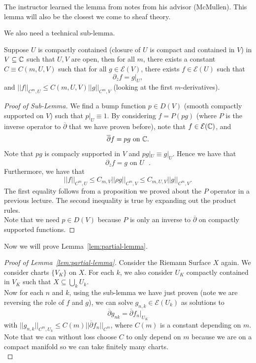 \documentclass{article}
\begin{document}
{\begin{remark}
    The instructor learned the lemma from notes from his advisor (McMullen). This lemma will also be the closest we come to sheaf theory.
\end{remark}

We also need a technical sub-lemma.
\begin{lemma}
    Suppose $U$ is compactly contained (closure of $U$ is compact and contained in $V$) in $V \subseteq \mathbb{C}$ such that $U, V$ are open, then for all $m$, there exists a constant $C \equiv C(m, U, V)$ such that for all $g \in \mathcal{E}(V)$, there exists $f \in \mathcal{E}(U)$ such that
    \[\partial_{\overline{z}} f = g|_U,\]
    and $||f||_{C^m, U} \leq C(m, U, V) ||g||_{C^m, V}$ (looking at the first $m$-derivatives).
\end{lemma}

\begin{proof}[Proof of Sub-Lemma]
    We find a bump function $p \in D(V)$ (smooth compactly supported on $V$) such that $p|_U \equiv 1$. By considering $f = P(pg)$ (where $P$ is the inverse operator to $\overline{\partial}$ that we have proven before), note that $f \in \mathcal{E}(\mathbb{C})$, and
    \[\overline{\partial} f = p g \text{ on } \mathbb{C}.\]
    Note that $pg$ is compacly supported in $V$ and $pg|_U \equiv g|_U$. Hence we have that
    \[\partial_{\overline{z}} f = g \text{ on $U$ }.\]
    Furthermore, we have that
    \[||f||_{C^m, U} \leq C_{m, V} || \rho g||_{C^m, V} \leq C_{m, U, V} ||g||_{C^m, V}. \]
    The first equality follows from a proposition we proved about the $P$ operator in a previous lecture. The second inequality is true by expanding out the product rules.\\
    
    Note that we need $p \in D(V)$ because $P$ is only an inverse to $\overline{\partial}$ on compactly supported functions.
\end{proof}

Now we will prove Lemma~\ref{lem:partial-lemma}.
\begin{proof}[Proof of Lemma~\ref{lem:partial-lemma}]
Consider the Riemann Surface $X$ again. We consider charts $\{V_{K}\}$ on $X$. For each $k$, we also consider $U_K$ compactly contained in $V_K$ such that $X \subseteq \bigcup_k U_k$.\\

Now for each $n$ and $k$, using the sub-lemma we have just proven (note we are reversing the role of $f$ and $g$), we can solve $g_{n, k} \in \mathcal{E}(U_k)$ as solutions to 
\[\overline{\partial} g_{n k} = \overline{\partial} f_n|_{U_K}\]
with $||g_{n,k}||_{C^m, U_k} \leq C(m) ||\overline{\partial} f_n||_{C^m}$, where $C(m)$ is a constant depending on $m$. Note that we can without loss choose $C$ to only depend on $m$ because we are on a compact manifold so we can take finitely many charts.\\


\end{proof}}
\end{document}
